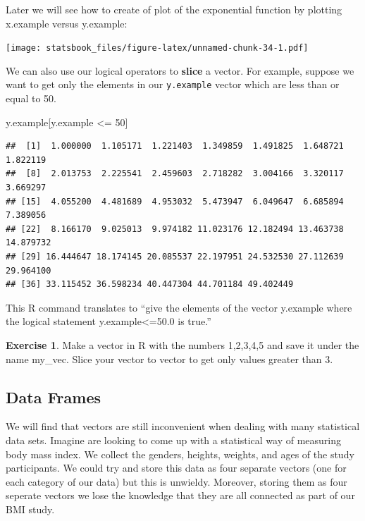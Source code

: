 \documentclass[
]{book}
\newenvironment{Shaded}{\begin{snugshade}}{\end{snugshade}}
\newcommand{\DecValTok}[1]{\textcolor[rgb]{0.00,0.00,0.81}{#1}}
\newcommand{\NormalTok}[1]{#1}
\newcommand{\SpecialCharTok}[1]{\textcolor[rgb]{0.00,0.00,0.00}{#1}}
\theoremstyle{definition}
\theoremstyle{definition}
\theoremstyle{definition}
\newtheorem{exercise}{Exercise}[chapter]
\theoremstyle{definition}
\theoremstyle{remark}
\begin{document}
Later we will see how to create of plot of the exponential function by plotting x.example versus y.example:

\texttt{[image: statsbook\_files/figure-latex/unnamed-chunk-34-1.pdf]}

We can also use our logical operators to \textbf{slice} a vector. For example, suppose we want to get only the elements in our \texttt{y.example} vector which are less than or equal to 50.

\begin{Shaded}
\begin{Highlighting}[]
\NormalTok{y.example[y.example }\SpecialCharTok{\textless{}=} \DecValTok{50}\NormalTok{]}
\end{Highlighting}
\end{Shaded}

\begin{verbatim}
##  [1]  1.000000  1.105171  1.221403  1.349859  1.491825  1.648721  1.822119
##  [8]  2.013753  2.225541  2.459603  2.718282  3.004166  3.320117  3.669297
## [15]  4.055200  4.481689  4.953032  5.473947  6.049647  6.685894  7.389056
## [22]  8.166170  9.025013  9.974182 11.023176 12.182494 13.463738 14.879732
## [29] 16.444647 18.174145 20.085537 22.197951 24.532530 27.112639 29.964100
## [36] 33.115452 36.598234 40.447304 44.701184 49.402449
\end{verbatim}

This R command translates to ``give the elements of the vector y.example where the logical statement y.example\textless=50.0 is true.''

\begin{exercise}
\protect\hypertarget{exr:unnamed-chunk-35}{}\label{exr:unnamed-chunk-35}Make a vector in R with the numbers 1,2,3,4,5 and save it under the name my\_vec. Slice your vector to vector to get only values greater than 3.
\end{exercise}

\hypertarget{data-frames}{%
\subsection{Data Frames}\label{data-frames}}

We will find that vectors are still inconvenient when dealing with many statistical data sets. Imagine are looking to come up with a statistical way of measuring body mass index. We collect the genders, heights, weights, and ages of the study participants. We could try and store this data as four separate vectors (one for each category of our data) but this is unwieldy. Moreover, storing them as four seperate vectors we lose the knowledge that they are all connected as part of our BMI study.
\end{document}
